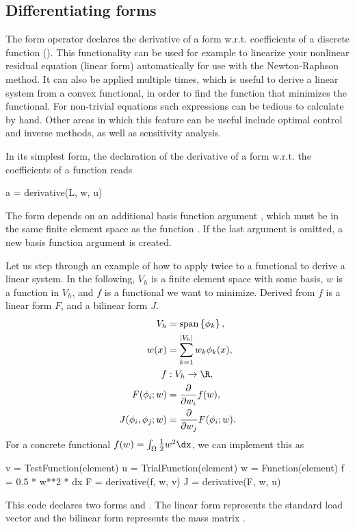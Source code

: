\subsection{Differentiating forms}
\label{ufl:sec:derivative}

The form operator  declares the derivative of a form
w.r.t. coefficients of a discrete function ().  This
functionality can be used for example to linearize your nonlinear
residual equation (linear form) automatically for use with the
Newton-Raphson method.  It can also be applied multiple times, which
is useful to derive a linear system from a convex functional, in order
to find the function that minimizes the functional.  For non-trivial
equations such expressions can be tedious to calculate by hand.  Other
areas in which this feature can be useful include optimal control and
inverse methods, as well as sensitivity analysis.

In its simplest form, the declaration of the derivative of a form
 w.r.t. the coefficients of a function  reads
\begin{code}
a = derivative(L, w, u)
\end{code}
The form  depends on an additional basis function argument
, which must be in the same finite element space as the function .
If the last argument is omitted, a new basis function argument is
created.

Let us step through an example of how to apply 
twice to a functional to derive a linear system.  In the following,
$V_h$ is a finite element space with some basis, $w$ is a function in
$V_h$, and $f$ is a functional we want to minimize. Derived from $f$
is a linear form $F$, and a bilinear form $J$.
\begin{align}
V_h &= \spans{ \phi_k }, \\
w(x) &= \sum_{k=1}^{|V_h|} w_k \phi_k(x), \\
f&: V_h \rightarrow \R, \\
F(\phi_i; w) &= \frac{\partial}{\partial w_i} f(w), \\
J(\phi_i, \phi_j; w) &= \frac{\partial}{\partial w_j} F(\phi_i; w) .
\end{align}
For a concrete functional $f(w) = \int_\Omega \frac 1 2 w^2 \dx$, we can implement this as
\begin{code}
v = TestFunction(element)
u = TrialFunction(element)
w = Function(element)
f = 0.5 * w**2 * dx
F = derivative(f, w, v)
J = derivative(F, w, u)
\end{code}
This code declares two forms  and .  The linear form
 represents the standard load vector  and the
bilinear form  represents the mass matrix .

